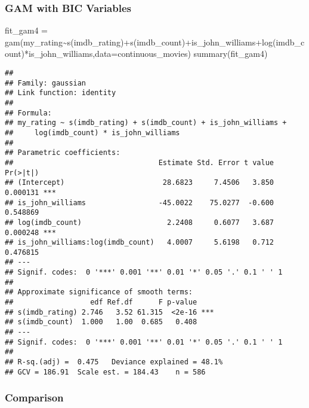 \documentclass[
]{article}
\newenvironment{Shaded}{\begin{snugshade}}{\end{snugshade}}
\newcommand{\AttributeTok}[1]{\textcolor[rgb]{0.77,0.63,0.00}{#1}}
\newcommand{\FunctionTok}[1]{\textcolor[rgb]{0.00,0.00,0.00}{#1}}
\newcommand{\NormalTok}[1]{#1}
\newcommand{\OtherTok}[1]{\textcolor[rgb]{0.56,0.35,0.01}{#1}}
\newcommand{\SpecialCharTok}[1]{\textcolor[rgb]{0.00,0.00,0.00}{#1}}
\begin{document}
\hypertarget{gam-with-bic-variables}{%
\subsubsection{GAM with BIC Variables}\label{gam-with-bic-variables}}

\begin{Shaded}
\begin{Highlighting}[]
\NormalTok{fit\_gam4 }\OtherTok{=} \FunctionTok{gam}\NormalTok{(my\_rating}\SpecialCharTok{\textasciitilde{}}\FunctionTok{s}\NormalTok{(imdb\_rating)}\SpecialCharTok{+}\FunctionTok{s}\NormalTok{(imdb\_count)}\SpecialCharTok{+}\NormalTok{is\_john\_williams}\SpecialCharTok{+}\FunctionTok{log}\NormalTok{(imdb\_count)}\SpecialCharTok{*}\NormalTok{is\_john\_williams,}\AttributeTok{data=}\NormalTok{continuous\_movies)}
\FunctionTok{summary}\NormalTok{(fit\_gam4)}
\end{Highlighting}
\end{Shaded}

\begin{verbatim}
## 
## Family: gaussian 
## Link function: identity 
## 
## Formula:
## my_rating ~ s(imdb_rating) + s(imdb_count) + is_john_williams + 
##     log(imdb_count) * is_john_williams
## 
## Parametric coefficients:
##                                  Estimate Std. Error t value Pr(>|t|)    
## (Intercept)                       28.6823     7.4506   3.850 0.000131 ***
## is_john_williams                 -45.0022    75.0277  -0.600 0.548869    
## log(imdb_count)                    2.2408     0.6077   3.687 0.000248 ***
## is_john_williams:log(imdb_count)   4.0007     5.6198   0.712 0.476815    
## ---
## Signif. codes:  0 '***' 0.001 '**' 0.01 '*' 0.05 '.' 0.1 ' ' 1
## 
## Approximate significance of smooth terms:
##                  edf Ref.df      F p-value    
## s(imdb_rating) 2.746   3.52 61.315  <2e-16 ***
## s(imdb_count)  1.000   1.00  0.685   0.408    
## ---
## Signif. codes:  0 '***' 0.001 '**' 0.01 '*' 0.05 '.' 0.1 ' ' 1
## 
## R-sq.(adj) =  0.475   Deviance explained = 48.1%
## GCV = 186.91  Scale est. = 184.43    n = 586
\end{verbatim}

\hypertarget{comparison-1}{%
\subsubsection{Comparison}\label{comparison-1}}
\end{document}
